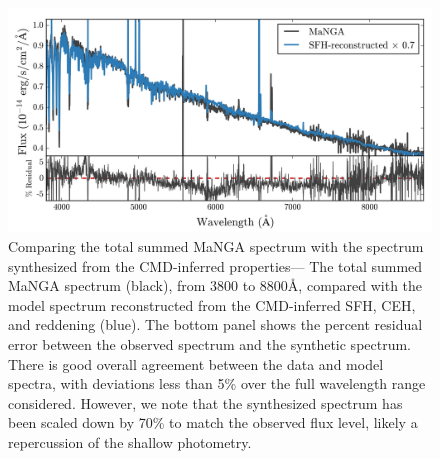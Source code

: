 \documentclass[preprint2]{aastex62}
\newcommand{\ang}{\ensuremath{\mbox{\AA}}\xspace}
\begin{document}
\begin{figure}
  \begin{center}
    \includegraphics[width=\linewidth]{figs/f6.png}
    \caption{{\sc Comparing the total summed MaNGA spectrum with the spectrum synthesized from the CMD-inferred properties---} The total summed MaNGA spectrum (black), from 3800 to 8800\ang, compared with the model spectrum reconstructed from the CMD-inferred SFH, CEH, and reddening (blue). The bottom panel shows the percent residual error between the observed spectrum and the synthetic spectrum. There is good overall agreement between the data and model spectra, with deviations less than 5\% over the full wavelength range considered. However, we note that the synthesized spectrum has been scaled down by 70\% to match the observed flux level, likely a repercussion of the shallow photometry.}
    \label{fig:fullSpec}
  \end{center}
\end{figure}
\end{document}
